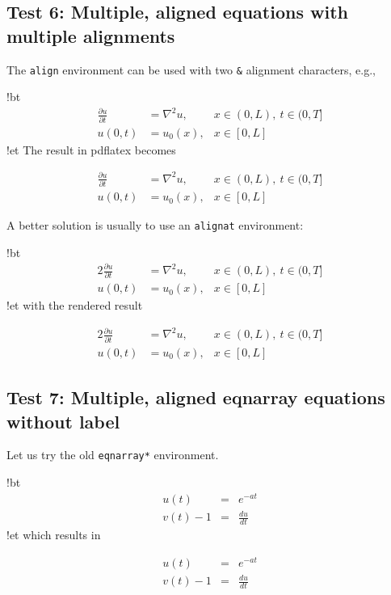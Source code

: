 \documentclass[%
oneside,                 %
final,                   %
10pt]{article}
\begin{document}
\subsection{Test 6: Multiple, aligned equations with multiple alignments}

The \texttt{align} environment can be used with two \Verb!&! alignment characters, e.g.,

\blatexcod
!bt
\begin{align}
\frac{\partial u}{\partial t} &= \nabla^2 u, & x\in (0,L),
\ t\in (0,T]\\ 
u(0,t) &= u_0(x), & x\in [0,L]
\end{align}
!et
\elatexcod
The result in pdflatex becomes

\begin{align}
\frac{\partial u}{\partial t} &= \nabla^2 u, & x\in (0,L),
\ t\in (0,T]\\ 
u(0,t) &= u_0(x), & x\in [0,L]
\end{align}

A better solution is usually to use an \texttt{alignat} environment:

\blatexcod
!bt
\begin{alignat}{2}
\frac{\partial u}{\partial t} &= \nabla^2 u, & x\in (0,L),
\ t\in (0,T]\\ 
u(0,t) &= u_0(x), & x\in [0,L]
\end{alignat}
!et
\elatexcod
with the rendered result

\begin{alignat}{2}
\frac{\partial u}{\partial t} &= \nabla^2 u, & x\in (0,L),
\ t\in (0,T]\\ 
u(0,t) &= u_0(x), & x\in [0,L]
\end{alignat}

\subsection{Test 7: Multiple, aligned eqnarray equations without label}

Let us try the old \texttt{eqnarray*} environment.

\blatexcod
!bt
\begin{eqnarray*}
u(t)&=& e^{-at}\\ 
v(t) - 1 &=& \frac{du}{dt}
\end{eqnarray*}
!et
\elatexcod
which results in

\begin{eqnarray*}
u(t)&=& e^{-at}\\ 
v(t) - 1 &=& \frac{du}{dt}
\end{eqnarray*}
\end{document}
